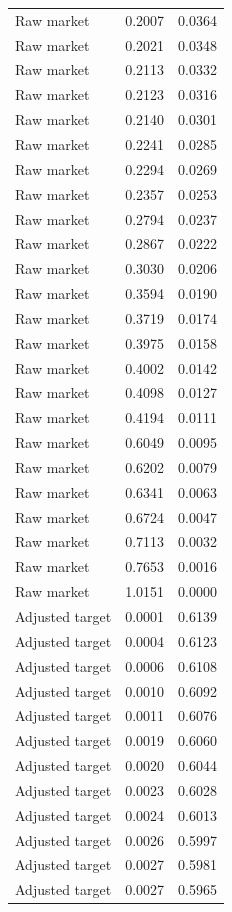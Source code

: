 \begin{table}[htbp]
\begin{tabular}{lll}
Raw market & 0.2007 & 0.0364 \\
Raw market & 0.2021 & 0.0348 \\
Raw market & 0.2113 & 0.0332 \\
Raw market & 0.2123 & 0.0316 \\
Raw market & 0.2140 & 0.0301 \\
Raw market & 0.2241 & 0.0285 \\
Raw market & 0.2294 & 0.0269 \\
Raw market & 0.2357 & 0.0253 \\
Raw market & 0.2794 & 0.0237 \\
Raw market & 0.2867 & 0.0222 \\
Raw market & 0.3030 & 0.0206 \\
Raw market & 0.3594 & 0.0190 \\
Raw market & 0.3719 & 0.0174 \\
Raw market & 0.3975 & 0.0158 \\
Raw market & 0.4002 & 0.0142 \\
Raw market & 0.4098 & 0.0127 \\
Raw market & 0.4194 & 0.0111 \\
Raw market & 0.6049 & 0.0095 \\
Raw market & 0.6202 & 0.0079 \\
Raw market & 0.6341 & 0.0063 \\
Raw market & 0.6724 & 0.0047 \\
Raw market & 0.7113 & 0.0032 \\
Raw market & 0.7653 & 0.0016 \\
Raw market & 1.0151 & 0.0000 \\
Adjusted target & 0.0001 & 0.6139 \\
Adjusted target & 0.0004 & 0.6123 \\
Adjusted target & 0.0006 & 0.6108 \\
Adjusted target & 0.0010 & 0.6092 \\
Adjusted target & 0.0011 & 0.6076 \\
Adjusted target & 0.0019 & 0.6060 \\
Adjusted target & 0.0020 & 0.6044 \\
Adjusted target & 0.0023 & 0.6028 \\
Adjusted target & 0.0024 & 0.6013 \\
Adjusted target & 0.0026 & 0.5997 \\
Adjusted target & 0.0027 & 0.5981 \\
Adjusted target & 0.0027 & 0.5965 \\

\end{tabular}
\end{table}
